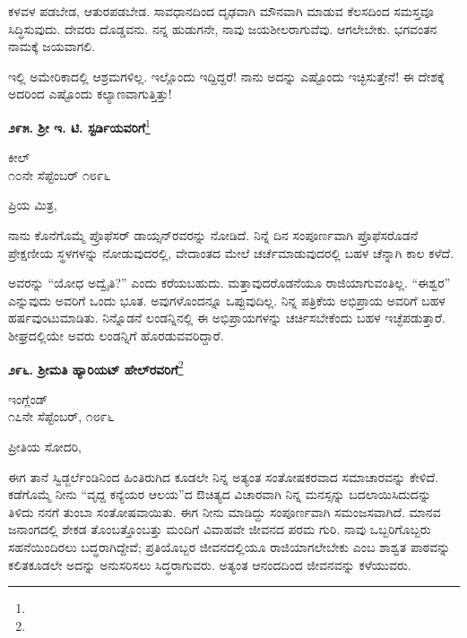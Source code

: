 ಕಳವಳ ಪಡಬೇಡ, ಆತುರಪಡಬೇಡ. ಸಾವಧಾನದಿಂದ ದೃಢವಾಗಿ ಮೌನವಾಗಿ ಮಾಡುವ ಕೆಲಸದಿಂದ ಸಮಸ್ತವೂ ಸಿದ್ಧಿಸುವುದು. ದೇವರು ದೊಡ್ಡವನು. ನನ್ನ ಹುಡುಗನೇ, ನಾವು ಜಯಶೀಲರಾಗುವೆವು. ಆಗಲೇಬೇಕು. ಭಗವಂತನ ನಾಮಕ್ಕೆ ಜಯವಾಗಲಿ.

ಇಲ್ಲಿ ಅಮೇರಿಕಾದಲ್ಲಿ ಆಶ್ರಮಗಳಿಲ್ಲ. ಇಲ್ಲೊಂದು ಇದ್ದಿದ್ದರೆ! ನಾನು ಅದನ್ನು ಎಷ್ಟೊಂದು ಇಚ್ಛಿಸುತ್ತೇನೆ! ಈ ದೇಶಕ್ಕೆ ಅದರಿಂದ ಎಷ್ಟೊಂದು ಕಲ್ಯಾಣವಾಗುತ್ತಿತ್ತು!
\vspace{-0.2cm}

\begin{center}
\textbf{೨೯೫. ಶ‍್ರೀ ಇ. ಟಿ. ಸ್ಟರ್ಡಿಯವರಿಗೆ}\footnote{}
\end{center}
\vspace{-0.5cm}

\begin{flushright}
ಕೀಲ್\\೧೦ನೇ ಸೆಪ್ಟೆಂಬರ್ ೧೮೯೬
\end{flushright}
\vspace{-0.4cm}

\noindent
ಪ್ರಿಯ ಮಿತ್ರ,

ನಾನು ಕೊನೆಗೊಮ್ಮೆ ಪ್ರೊಫೆಸರ್ ಡಾಯ್ಸನ್‌ರವರನ್ನು ನೋಡಿದೆ. ನಿನ್ನೆ ದಿನ ಸಂಪೂರ್ಣವಾಗಿ ಪ್ರೊಫೆಸರೊಡನೆ ಪ್ರೇಕ್ಷಣೀಯ ಸ್ಥಳಗಳನ್ನು ನೋಡುವುದರಲ್ಲಿ, ವೇದಾಂತದ ಮೇಲೆ ಚರ್ಚೆಮಾಡುವುದರಲ್ಲಿ ಬಹಳ ಚೆನ್ನಾಗಿ ಕಾಲ ಕಳೆದೆ.

ಅವರನ್ನು “ಯೋಧ ಅದ್ವೈತಿ?” ಎಂದು ಕರೆಯಬಹುದು. ಮತ್ತಾವುದರೊಡನೆಯೂ ರಾಜಿಯಾಗುವಂತಿಲ್ಲ. “ಈಶ್ವರ” ಎನ್ನುವುದು ಅವರಿಗೆ ಒಂದು ಭೂತ. ಅವುಗಳೊಂದನ್ನೂ ಒಪ್ಪುವುದಿಲ್ಲ. ನಿನ್ನ ಪತ್ರಿಕೆಯ ಅಭಿಪ್ರಾಯ ಅವರಿಗೆ ಬಹಳ ಹರ್ಷವುಂಟುಮಾಡಿತು. ನಿನ್ನೊಡನೆ ಲಂಡನ್ನಿನಲ್ಲಿ ಈ ಅಭಿಪ್ರಾಯಗಳನ್ನು ಚರ್ಚಿಸಬೇಕೆಂದು ಬಹಳ ಇಚ್ಛೆಪಡುತ್ತಾರೆ. ಶೀಘ್ರದಲ್ಲಿಯೇ ಅವರು ಲಂಡನ್ನಿಗೆ ಹೊರಡುವವರಿದ್ದಾರೆ.

\begin{center}
\textbf{೨೯೬. ಶ‍್ರೀಮತಿ ಹ್ಯಾರಿಯಟ್ ಹೇಲ್‌ರವರಿಗೆ}\footnote{}
\end{center}

\begin{flushright}
ಇಂಗ್ಲೆಂಡ್\\೧೭ನೇ ಸೆಪ್ಟೆಂಬರ್, ೧೮೯೬
\end{flushright}

\noindent
ಪ್ರೀತಿಯ ಸೋದರಿ,

ಈಗ ತಾನೆ ಸ್ವಿಡ್ಜರ್ಲೆಂಡಿನಿಂದ ಹಿಂತಿರುಗಿದ ಕೂಡಲೇ ನಿನ್ನ ಅತ್ಯಂತ ಸಂತೋಷಕರವಾದ ಸಮಾಚಾರವನ್ನು ಕೇಳಿದೆ. ಕಡೆಗೊಮ್ಮೆ ನೀನು “ವೃದ್ದ ಕನ್ಯೆಯರ ಆಲಯ”ದ ಔಚಿತ್ಯದ ವಿಚಾರವಾಗಿ ನಿನ್ನ ಮನಸ್ಸನ್ನು ಬದಲಾಯಿಸಿದುದನ್ನು ತಿಳಿದು ನನಗೆ ತುಂಬಾ ಸಂತೋಷವಾಯಿತು. ಈಗ ನೀನು ಮಾಡಿದ್ದು ಸಂಪೂರ್ಣವಾಗಿ ಸಮಂಜಸವಾಗಿದೆ. ಮಾನವ ಜನಾಂಗದಲ್ಲಿ ಶೇಕಡ ತೊಂಬತ್ತೊಂಬತ್ತು ಮಂದಿಗೆ ವಿವಾಹವೇ ಜೀವನದ ಪರಮ ಗುರಿ. ನಾವು ಒಬ್ಬರಿಗೊಬ್ಬರು ಸಹನೆಯಿಂದಿರಲು ಬದ್ಧರಾಗಿದ್ದೇವೆ; ಪ್ರತಿಯೊಬ್ಬರ ಜೀವನದಲ್ಲಿಯೂ ರಾಜಿಯಾಗಲೇಬೇಕು\enginline{-} ಎಂಬ ಶಾಶ್ವತ ಪಾಠವನ್ನು ಕಲಿತಕೂಡಲೇ ಅದನ್ನು ಅನುಸರಿಸಲು ಸಿದ್ಧರಾಗುವರು. ಅತ್ಯಂತ ಆನಂದದಿಂದ ಜೀವನವನ್ನು ಕಳೆಯುವರು.

